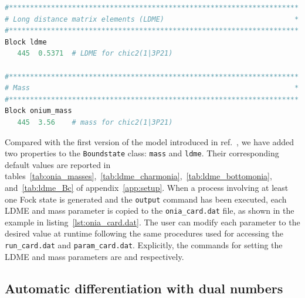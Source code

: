 \begin{lstlisting}[caption={\it\small Example of the {\tt onia\_card.dat} in case of the production of the $^3\pwave_2^{[1]}$ $\chi_{c2}$ state.},captionpos=b,language=Python,label={lst:onia_card.dat},float=tp,floatplacement=tbp]
#*********************************************************************
# Long distance matrix elements (LDME)                               *
#*********************************************************************
Block ldme
   445  0.5371  # LDME for chic2(1|3P21)
   
#*********************************************************************
# Mass                                                               *
#*********************************************************************
Block onium_mass
   445  3.56    # mass for chic2(1|3P21)
\end{lstlisting}

Compared with the first version of the model introduced in ref.~\cite{ColpaniSerri:2025vdz}, we have added two properties to the \texttt{Boundstate} class: \texttt{mass} and \texttt{ldme}.
Their corresponding default values are reported in tables~\ref{tab:onia_masses},~\ref{tab:ldme_charmonia},~\ref{tab:ldme_bottomonia}, and~\ref{tab:ldme_Bc} of appendix~\ref{app:setup}.
When a process involving at least one Fock state is generated and the {\tt output} command has been executed, each LDME and mass parameter is copied to the \texttt{onia\_card.dat} file, as shown in the example in listing~\ref{lst:onia_card.dat}. The user can modify each parameter to the desired value at runtime following the same procedures used for accessing the {\tt run\_card.dat} and {\tt param\_card.dat}. Explicitly, the commands for setting the LDME and mass parameters are
\noindent
and
\noindent
respectively.


\subsection{Automatic differentiation with dual numbers}

